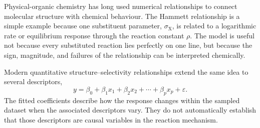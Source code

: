 
Physical-organic chemistry has long used numerical relationships to connect molecular structure with chemical behaviour.
The Hammett relationship is a simple example because one substituent parameter, $\sigma_{\mathrm{X}}$, is related to a logarithmic rate or equilibrium response through the reaction constant $\rho$.
The model is useful not because every substituted reaction lies perfectly on one line, but because the sign, magnitude, and failures of the relationship can be interpreted chemically.

Modern quantitative structure--selectivity relationships extend the same idea to several descriptors,
\begin{equation}
  y=\beta_0+\beta_1x_1+\beta_2x_2+\cdots+\beta_px_p+\varepsilon.
\end{equation}
The fitted coefficients describe how the response changes within the sampled dataset when the associated descriptors vary.
They do not automatically establish that those descriptors are causal variables in the reaction mechanism.

